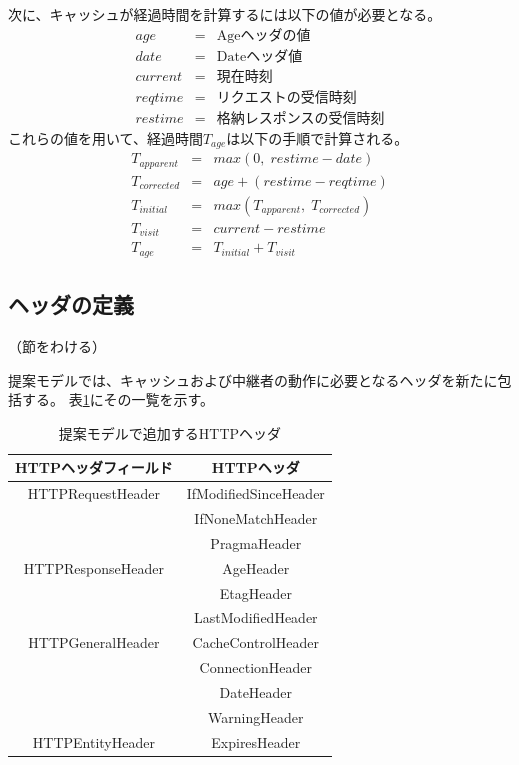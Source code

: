 \documentclass{css}
\begin{document}
次に、キャッシュが経過時間を計算するには以下の値が必要となる。
\begin{eqnarray*}
age & = & \mbox{Ageヘッダの値}\\
date & = & \mbox{Dateヘッダ値}\\
current & = & \mbox{現在時刻}\\
reqtime & = & \mbox{リクエストの受信時刻}\\
restime & = & \mbox{格納レスポンスの受信時刻}
\end{eqnarray*}
これらの値を用いて、経過時間$T_{age}$は以下の手順で計算される。
\begin{eqnarray*}
T_{apparent} & = & max(0,\;restime - date)\\
T_{corrected} & = & age + (restime - reqtime)\\
T_{initial} & = & max(T_{apparent},\;T_{corrected})\\
T_{visit} & = & current - restime\\
T_{age} & = & T_{initial} + T_{visit}
\end{eqnarray*}

\subsection{ヘッダの定義}

\color{red}
（節をわける）
\color{black}

提案モデルでは、キャッシュおよび中継者の動作に必要となるヘッダを新たに包括する。
表\ref{tb:model_header}にその一覧を示す。

\begin{table}[htb]
\centering
\caption{提案モデルで追加するHTTPヘッダ}
\label{tb:model_header}
\begin{tabular}{c|c}
\hline
HTTPヘッダフィールド & HTTPヘッダ \\ \hline \hline
HTTPRequestHeader & IfModifiedSinceHeader \\
 & IfNoneMatchHeader \\
 & PragmaHeader \\ \hline
HTTPResponseHeader & AgeHeader \\
　& EtagHeader \\
 & LastModifiedHeader \\ \hline
HTTPGeneralHeader & CacheControlHeader \\
 & ConnectionHeader \\
 & DateHeader \\
 & WarningHeader \\ \hline
HTTPEntityHeader & ExpiresHeader \\ \hline
\end{tabular}
\end{table}
\end{document}
